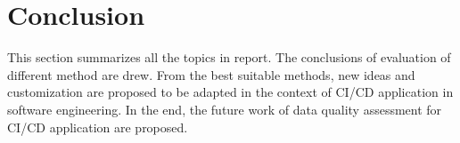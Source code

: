 \documentclass[pdftex,english,oribibl]{llncs}
\begin{document}
\section{Conclusion}
This section summarizes all the topics in report.
The conclusions of evaluation of different method are drew.
From the best suitable methods, new ideas and customization are proposed to be adapted in the context of CI/CD application in software engineering.
In the end, the future work of data quality assessment for CI/CD application are proposed.

\end{document}

